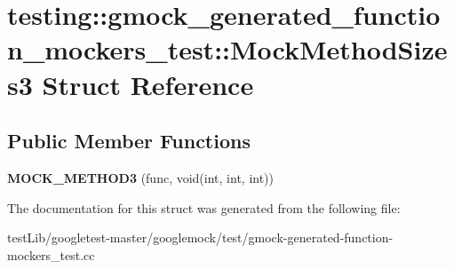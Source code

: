 \hypertarget{structtesting_1_1gmock__generated__function__mockers__test_1_1MockMethodSizes3}{}\section{testing\+:\+:gmock\+\_\+generated\+\_\+function\+\_\+mockers\+\_\+test\+:\+:Mock\+Method\+Sizes3 Struct Reference}
\label{structtesting_1_1gmock__generated__function__mockers__test_1_1MockMethodSizes3}
\subsection*{Public Member Functions}
\begin{DoxyCompactItemize}
\item 
\mbox{\label{structtesting_1_1gmock__generated__function__mockers__test_1_1MockMethodSizes3_a53c9699f920b15d624620e8dab0bfc62}} 
{\bfseries M\+O\+C\+K\+\_\+\+M\+E\+T\+H\+O\+D3} (func, void(int, int, int))
\end{DoxyCompactItemize}


The documentation for this struct was generated from the following file\+:\begin{DoxyCompactItemize}
\item 
test\+Lib/googletest-\/master/googlemock/test/gmock-\/generated-\/function-\/mockers\+\_\+test.\+cc\end{DoxyCompactItemize}
